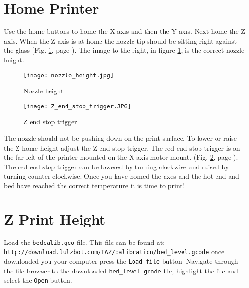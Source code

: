 \section{Home Printer}
Use the home buttons to home the X axis and then the Y axis. Next home the Z axis. When the Z axis is at home the nozzle tip should be sitting right against the glass
(Fig. \ref{fig:nozzle_height}, page \pageref{fig:nozzle_height}). The image to the right, in figure \ref{fig:nozzle_height}, is the correct nozzle height.
\begin{figure}[p]
\centering
\texttt{[image: nozzle\_height.jpg]}
\caption{Nozzle height}
\label{fig:nozzle_height}
\end{figure}
\begin{figure}[p]
\centering
\texttt{[image: Z\_end\_stop\_trigger.JPG]}
\caption{Z end stop trigger}
\label{fig:Z_end_stop_trigger}
\end{figure}
The nozzle should not be pushing down on the print surface. To lower or raise the Z home height adjust the Z end stop trigger. The red end stop trigger is on the far left of the printer mounted on the X-axis motor mount.
(Fig. \ref{fig:Z_end_stop_trigger}, page \pageref{fig:Z_end_stop_trigger}).
The red end stop trigger can be lowered by turning clockwise and raised by turning counter-clockwise. Once you have homed the axes and the hot end and bed have reached the correct temperature it is time to print!

\section{Z Print Height}
Load the \texttt{bedcalib.gco} file.
This file can be found at: \texttt{http://download.lulzbot.com/TAZ/calibration/bed_level.gcode} once downloaded you your computer press the \texttt{Load file} button. Navigate through the file browser to the downloaded \texttt{bed_level.gcode} file, highlight the file and select the \texttt{Open} button.


